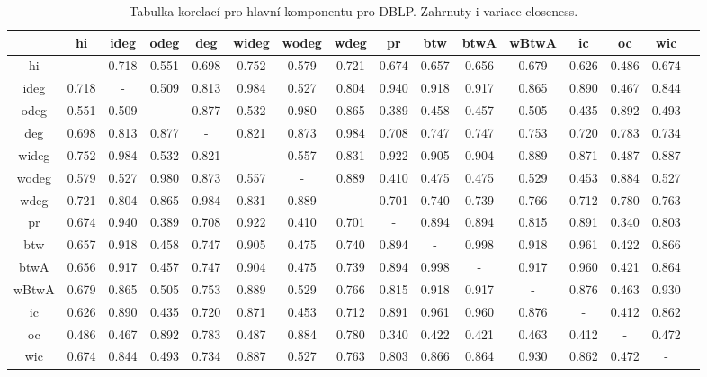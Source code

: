 \documentclass{bakalarka}
\begin{document}
\begin{table}[!ht]
\centering
\begin{sideways}
\begin{footnotesize}
\begin{tabular}{c|ccccccccccccccc}
\toprule
&hi  &ideg &odeg &deg  &wideg&wodeg&wdeg &pr   &btw  &btwA &wBtwA&ic   &oc   &wic\\
\midrule
hi   &  -  &0.718&0.551&0.698&0.752&0.579&0.721&0.674&0.657&0.656&0.679&0.626&0.486&0.674\\
ideg &0.718&  -  &0.509&0.813&0.984&0.527&0.804&0.940&0.918&0.917&0.865&0.890&0.467&0.844\\
odeg &0.551&0.509&  -  &0.877&0.532&0.980&0.865&0.389&0.458&0.457&0.505&0.435&0.892&0.493\\
deg  &0.698&0.813&0.877&  -  &0.821&0.873&0.984&0.708&0.747&0.747&0.753&0.720&0.783&0.734\\
wideg&0.752&0.984&0.532&0.821&  -  &0.557&0.831&0.922&0.905&0.904&0.889&0.871&0.487&0.887\\
wodeg&0.579&0.527&0.980&0.873&0.557&  -  &0.889&0.410&0.475&0.475&0.529&0.453&0.884&0.527\\
wdeg &0.721&0.804&0.865&0.984&0.831&0.889&  -  &0.701&0.740&0.739&0.766&0.712&0.780&0.763\\
pr   &0.674&0.940&0.389&0.708&0.922&0.410&0.701&  -  &0.894&0.894&0.815&0.891&0.340&0.803\\
btw  &0.657&0.918&0.458&0.747&0.905&0.475&0.740&0.894&  -  &0.998&0.918&0.961&0.422&0.866\\
btwA &0.656&0.917&0.457&0.747&0.904&0.475&0.739&0.894&0.998&  -  &0.917&0.960&0.421&0.864\\
wBtwA&0.679&0.865&0.505&0.753&0.889&0.529&0.766&0.815&0.918&0.917&  -  &0.876&0.463&0.930\\
ic   &0.626&0.890&0.435&0.720&0.871&0.453&0.712&0.891&0.961&0.960&0.876&  -  &0.412&0.862\\
oc   &0.486&0.467&0.892&0.783&0.487&0.884&0.780&0.340&0.422&0.421&0.463&0.412&  -  &0.472\\
wic  &0.674&0.844&0.493&0.734&0.887&0.527&0.763&0.803&0.866&0.864&0.930&0.862&0.472&  -  \\
\bottomrule
\end{tabular}
\end{footnotesize}
\end{sideways}
\caption{Tabulka korelací pro hlavní komponentu pro DBLP. Zahrnuty i variace closeness.}
\label{tab:corr2}
\end{table}
\end{document}
